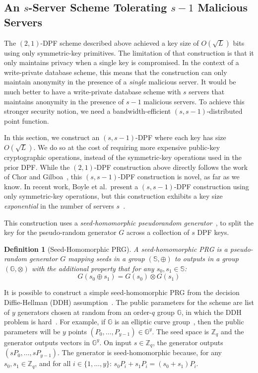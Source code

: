 \documentclass[10pt,twocolumn]{article}
\newtheorem{defn}{Definition}
\newcommand{\Z}{\mathbb{Z}}
\newcommand{\Seed}{\mathbb{S}}
\newcommand{\G}{\mathbb{G}}
\begin{document}
\subsection{An $s$-Server Scheme Tolerating $s-1$ Malicious Servers}
\label{sec:dpf:manyserver}

The $(2,1)$-DPF scheme described above 
achieved a key size of $O(\sqrt{L})$ bits using only 
symmetric-key primitives.
The limitation of that construction is that it only
maintains privacy when a single key is compromised.
In the context of a write-private database scheme, this
means that the construction 
can only maintain anonymity in the presence
of a {\em single} malicious server.
It would be much better to have a write-private database 
scheme with $s$ servers that maintains anonymity in the
presence of $s-1$ malicious servers.
To achieve this stronger security notion, we need a
bandwidth-efficient
$(s,s-1)$-distributed point function.

In this section, we construct an $(s,s-1)$-DPF
where each key has size $O(\sqrt{L})$.
We do so at the cost of requiring more expensive 
public-key cryptographic operations, 
instead of the symmetric-key operations used
in the prior DPF.
While the $(2,1)$-DPF construction above
directly follows the work of Chor and Gilboa~\cite{chor1997computationally},
this $(s,s-1)$-DPF construction is novel, as far as we know.
In recent work, Boyle et al.~present a $(s,s-1)$-DPF construction using only symmetric-key 
operations, but this construction exhibits a key size {\em exponential} in 
the number of servers $s$~\cite{boyle2015function}.

\medskip

This construction uses
a \textit{seed-homomorphic pseudorandom 
generator}~\cite{banerjee2014new,boneh2013key,naor1999distributed},
to split the key for the pseudo-random generator $G$ across
a collection of $s$ DPF keys.

\begin{defn}[Seed-Homomorphic PRG]
A {\em seed-homomorphic} PRG is a pseudo-random generator
$G$ mapping seeds in a group
$(\Seed, \oplus)$ to outputs in a group $(\G, \otimes)$ 
with the additional property that for any $s_0, s_1 \in \Seed$:
\[ G(s_0 \oplus s_1) = G(s_0) \otimes G(s_1) \]
\end{defn}

It is possible to construct a simple seed-homomorphic PRG from the decision
Diffie-Hellman (DDH) assumption~\cite{boneh2013key,naor1999distributed}.
The public parameters for the scheme are 
list of $y$ generators chosen at random from an order-$q$ 
group $\G$, in which the DDH problem is hard~\cite{boneh1998decision}.
For example, if $\G$ is an elliptic curve group~\cite{miller1986use},
then the public parameters will be $y$ points $(P_0, \dots, P_{y-1}) \in \G^y$.
The seed space is $\Z_q$ and the generator
outputs vectors in $\G^y$.
On input $s \in \Z_q$, the generator outputs
$(sP_0, \dots, sP_{y-1})$.
The generator is seed-homomorphic because,
for any $s_0,s_1 \in \Z_q$, and for
all $i \in \{1, \dots, y\}$: 
$s_0P_i + s_1 P_i = (s_0+s_1)P_i$. 
\end{document}
